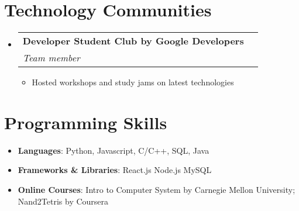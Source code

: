 \documentclass[letterpaper,11pt]{article}
\makeatletter
\newcommand{\resumeItem}[2]{
  \item\small{
    \textbf{#1}{#2 \vspace{-2pt}}
  }
}
\newcommand{\resumeSubheading}[4]{
  \item
    \begin{tabular*}{0.97\textwidth}[t]{l@{\extracolsep{\fill}}r}
      \textbf{#1} & \textbf{#2} \\
      \textit{\small#3} & \textit{\small#4} \\
    \end{tabular*}\vspace{-5pt}
}
\newcommand{\resumeSubHeadingListStart}{\begin{itemize}[leftmargin=*]}
\newcommand{\resumeSubHeadingListEnd}{\end{itemize}}
\newcommand{\resumeItemListStart}{\begin{itemize}}
\newcommand{\resumeItemListEnd}{\end{itemize}\vspace{-5pt}}
\makeatother
\begin{document}
\section{Technology Communities}
  \resumeSubHeadingListStart
  \renewcommand\labelitemi{}
    \resumeSubheading
      {Developer Student Club by Google Developers}{}
      {Team member}{}
      \resumeItemListStart
        \resumeItem{}
          {Hosted workshops and study jams on latest technologies}
      \resumeItemListEnd
  \resumeSubHeadingListEnd

\section{Programming Skills}
 \resumeSubHeadingListStart
   \item[]{
     \textbf{Languages}{: Python, Javascript, C/C++, SQL, Java}
   }
   \item[]{
     \textbf{Frameworks \& Libraries}{: React.js Node.js MySQL }
   }
   \item[]{
     \textbf{Online Courses}{: Intro to Computer System by Carnegie Mellon University; Nand2Tetris by Coursera}
   }
 \resumeSubHeadingListEnd
\end{document}
